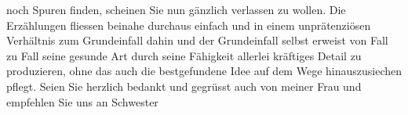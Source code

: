 \begin{ledgroupsized}[t]{13cm}
                    noch Spuren finden, scheinen Sie nun gänzlich verlassen zu wollen. Die
                    Erzählungen fliessen beinahe durchaus einfach und in einem unprätenziösen
                    Verhältnis zum Grundeinfall dahin und der Grundeinfall selbst erweist von Fall
                    zu Fall seine gesunde Art durch seine Fähigkeit allerlei kräftiges Detail zu
                    produzieren, ohne das auch die bestgefundene Idee auf dem Wege hinauszusiechen
                    pflegt.\pend
           \pstart
           Seien Sie herzlich bedankt und gegrüsst auch von meiner Frau und empfehlen Sie uns an Schwester\pend
           \endnumbering{}\end{ledgroupsized}  \newcommand{\dateiname}{L01940}\newcommand{\titel}{Arthur Schnitzler an Max Mell, 28. 6. 1910}\newcommand{\editorInnen}{Martin Anton Müller und Gerd-Hermann Susen}
      